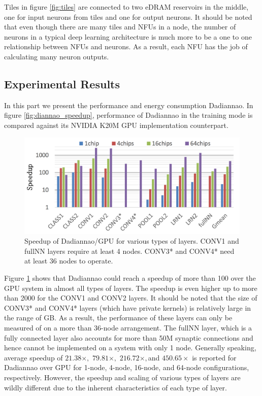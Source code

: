 \documentclass[runningheads,a4paper]{llncs}
\begin{document}
Tiles in figure \ref{fig:tiles} are connected to two eDRAM reservoirs in the middle, one for input neurons from tiles and one for output neurons. It should be noted that even though there are many tiles and NFUs in a node, the number of neurons in a typical deep learning architecture is much more to be a one to one relationship between NFUs and neurons. As a result, each NFU has the job of calculating many neuron outputs. 

\subsection*{Experimental Results}
In this part we present the performance and energy consumption Dadiannao. In figure \ref{fig:diannao_speedup}, performance of Dadiannao in the training mode is compared against its NVIDIA K20M GPU implementation counterpart.
\begin{figure}[h]
	\includegraphics[scale=0.45]{./images/dadiannao_speedup.png}
	\centering
	\caption{Speedup of Dadiannao/GPU for various types of layers. CONV1 and fullNN layers require at least 4 nodes. CONV3* and CONV4* need at least 36 nodes to operate\cite{chen2014dadiannao}.}
	\label{fig:dadiannao_speedup}
\end{figure}

Figure \ref{fig:dadiannao_speedup} shows that Dadiannao could reach a speedup of more than 100 over the GPU system in almost all types of layers. The speedup is even higher up to more than 2000 for the CONV1 and CONV2 layers. It should be noted that the size of CONV3* and CONV4* layers (which have private kernels) is relatively large in the range of GB. As a result, the performance of these layers can only be measured of on a more than 36-node arrangement. The fullNN layer, which is a fully connected layer also accounts for more than 50M synaptic connections and hence cannot be implemented on a system with only 1 node. Generally speaking, average speedup of $21.38\times,$ $79.81\times,$ $216.72\times,$and $450.65\times$ is reported for Dadiannao over GPU for 1-node, 4-node, 16-node, and 64-node configurations, respectively. However, the speedup and scaling of various types of layers are wildly different due to the inherent characteristics of each type of layer.\\
\end{document}
